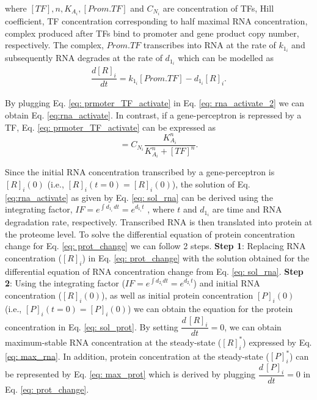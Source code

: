 \documentclass[twocolumn]{biophys-new}
\begin{document}
{{where $[TF], n, K_{A_i},  [Prom.TF]$ and $C_{N_i}$ are concentration of TFs, Hill coefficient, TF concentration corresponding to half maximal RNA concentration, complex produced after TFs bind to promoter and gene product copy number, respectively. 
The complex, $Prom.TF$  transcribes into RNA at the rate of $k_{1_i}$ and subsequently RNA degrades at the rate of $d_{1_i}$ which can be modelled as
\begin{gather}
    \dfrac{d[R]_i}{dt}= k_{1_i} [Prom.TF]- d_{1_i} [R]_i. \label{eq: rna_activate_2} 
\end{gather}

By plugging Eq. \ref{eq: prmoter_TF_activate} in Eq. \ref{eq: rna_activate_2} we can obtain Eq. \ref{eq:rna_activate}. In contrast, if a gene-perceptron is repressed by a TF,  Eq. \ref{eq: prmoter_TF_activate} can be expressed as
\begin{equation}
    [Prom.TF]= C_{N_i} \dfrac{K_{A_i}^n}{K_{A_i}^n + [TF]^n}. \label{eq:prmoter_TF_repress}
\end{equation}

Since the initial RNA concentration transcribed by a gene-perceptron is $[R]_i(0)$ (i.e., $[R]_i(t=0)=[R]_i(0)$), the solution of  Eq. \ref{eq:rna_activate} as given by Eq. \ref{eq: sol_rna} can be derived using the integrating factor, $IF=  e^{\int d_{1_i} \,dt}= e^{d_{1_i}t}$ ,
where $t$ and  $d_{1_i}$ are time and RNA degradation rate, respectively.  
Transcribed RNA is then translated into protein at the proteome level. 
To solve the differential equation of protein concentration change for Eq. \ref{eq: prot_change} we can follow 2 steps. {\bf Step 1}: Replacing RNA concentration  ($[R]_i$) in Eq. \ref{eq: prot_change} with the solution obtained for the differential equation of RNA concentration change from Eq. \ref{eq: sol_rna}. {\bf Step 2}: Using the integrating factor ($IF= e^{\int d_{2_i} dt}= e^{d_{2_i}t}$) and initial RNA concentration ($[R]_i(0)$), as well as initial protein concentration $[P]_i(0)$ (i.e., $[P]_i(t=0)=[P]_i(0)$) we can obtain the equation for the protein concentration in Eq. \ref{eq: sol_prot}.  
By setting $\dfrac{d \,[R]_i}{dt}=0$, we can obtain maximum-stable RNA concentration at the steady-state ($[R]_i^*$) expressed by Eq. \ref{eq: max_rna}. In addition, protein concentration at the steady-state ($[P]_i^*$) can be represented by Eq. \ref{eq: max_prot}  which is derived by plugging $\dfrac{d \,[P]_i}{dt}=0$ in Eq. \ref{eq: prot_change}. 




}}
\end{document}
